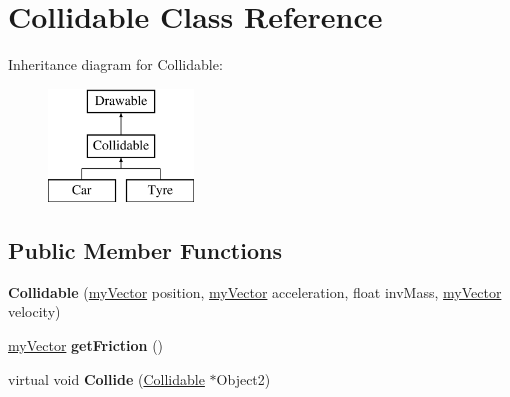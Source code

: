 \hypertarget{class_collidable}{}\section{Collidable Class Reference}
\label{class_collidable}
Inheritance diagram for Collidable\+:\begin{figure}[H]
\begin{center}
\leavevmode
\includegraphics[height=3.000000cm]{class_collidable}
\end{center}
\end{figure}
\subsection*{Public Member Functions}
\begin{DoxyCompactItemize}
\item 
\hypertarget{class_collidable_ad2dd423735fd869f76c55df162d6eff2}{}{\bfseries Collidable} (\hyperlink{classmy_vector}{my\+Vector} position, \hyperlink{classmy_vector}{my\+Vector} acceleration, float inv\+Mass, \hyperlink{classmy_vector}{my\+Vector} velocity)\label{class_collidable_ad2dd423735fd869f76c55df162d6eff2}

\item 
\hypertarget{class_collidable_a5aaff018202f598eeefd6bc0968d5adb}{}\hyperlink{classmy_vector}{my\+Vector} {\bfseries get\+Friction} ()\label{class_collidable_a5aaff018202f598eeefd6bc0968d5adb}

\item 
\hypertarget{class_collidable_abfe491d3368cfc9c1407b91b4d5d3d77}{}virtual void {\bfseries Collide} (\hyperlink{class_collidable}{Collidable} $\ast$Object2)\label{class_collidable_abfe491d3368cfc9c1407b91b4d5d3d77}

\end{DoxyCompactItemize}
